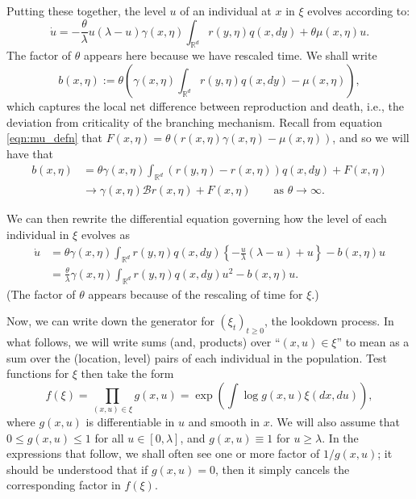 \documentclass[12pt]{article}
\newcommand{\IR}{\mathbb R}
\newcommand{\DG}{\mathcal{B}}  %
\newcommand{\lp}{\xi}              %
\begin{document}
Putting these together,
the level $u$ of an individual at $x$ in $\lp$ evolves according to:
$$
    \dot u
    =
    - \frac{\theta}{\lambda} u \left(\lambda - u\right)
    \gamma(x, \eta) \int_{\IR^d} r(y, \eta) q(x, dy) 
    +
    \theta \mu(x,\eta) u .
$$
The factor of $\theta$ appears here because we have rescaled time.
We shall write 
$$
    b(x, \eta)
    :=
    \theta\left(
    \gamma(x,\eta) \int_{\IR^d} r(y, \eta) q(x, dy)
    -
    \mu(x,\eta)
    \right) ,
$$
which captures the local net difference between reproduction and death,
i.e., the deviation from criticality of the branching mechanism.
Recall from equation \eqref{eqn:mu_defn} that
$F(x,\eta) = \theta(r(x,\eta)\gamma(x,\eta) - \mu(x,\eta))$,
and so we will have that
\begin{align} \label{eqn:b_limit}
b(x, \eta)
&=
    \theta \gamma(x, \eta) \int_{\IR^d} \left( r(y, \eta) - r(x, \eta) \right) q(x, dy)
    + F(x, \eta) \\
&\to
    \gamma(x, \eta) \DG r(x, \eta) + F(x, \eta) \qquad \text{as } \theta \to \infty .
\end{align}

We can then rewrite the differential equation 
governing how the level of each individual
in $\lp$ evolves as
\begin{align}
\dot{u}
    &=
    \theta \gamma(x,\eta) \int_{\IR^d} r(y, \eta) q(x, dy)
    \left\{
        -\frac{u}{\lambda}\left(\lambda - u\right)
        + u
    \right\}
    -
    b(x,\eta) u
    \nonumber \\
    &=
    \frac{\theta}{\lambda} \gamma(x,\eta) \int_{\IR^d} r(y, \eta) q(x, dy) u^2
    -
    b(x, \eta) u
    . \label{differential equation for level}
\end{align}
(The factor of $\theta$ appears because of the rescaling of time for $\lp$.)

Now, we can write down the generator for $(\lp_t)_{t \ge 0}$,
the lookdown process.
In what follows, we will write sums (and, products) over ``$(x, u) \in \xi$''
to mean as a sum over the (location, level) pairs of each individual in the population.
Test functions for $\lp$ then take the form
\begin{equation} \label{eqn:test_functions}
f(\lp)=\prod_{(x,u)\in \lp}g(x,u)=\exp\left(\int \log g(x,u)\lp(dx, du)\right),
\end{equation}
where
$g(x,u)$ is differentiable in $u$ and 
smooth in $x$.
We will also assume that $0\leq g(x,u) \leq 1$ for all $u\in [0,\lambda]$,
and $g(x,u)\equiv 1$ for $u\geq \lambda$.
In the expressions that follow,
we shall often see one or more factor of $1/g(x,u)$;
it should be understood that if $g(x,u)=0$,
then it simply cancels 
the corresponding factor in $f(\lp)$.
\end{document}

